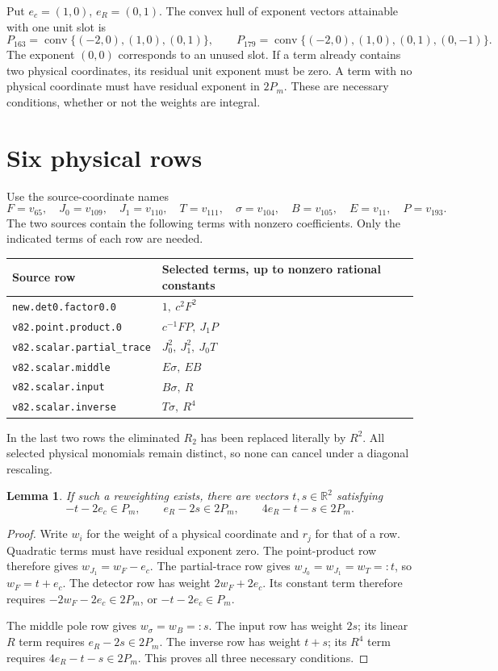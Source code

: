 \documentclass[11pt]{article}
\newtheorem{lemma}{Lemma}
\newcommand{\R}{\mathbb R}
\begin{document}
Put \(e_c=(1,0)\), \(e_R=(0,1)\). The convex hull of exponent
vectors attainable with one unit slot is
\[
 P_{163}=\operatorname{conv}\{(-2,0),(1,0),(0,1)\},\qquad
 P_{179}=\operatorname{conv}\{(-2,0),(1,0),(0,1),(0,-1)\}.
\]
The exponent \((0,0)\) corresponds to an unused slot. If a term
already contains two physical coordinates, its residual unit exponent
must be zero. A term with no physical coordinate must have residual
exponent in \(2P_m\). These are necessary conditions, whether or not
the weights are integral.

\section{Six physical rows}
Use the source-coordinate names
\[
 F=v_{65},\quad J_0=v_{109},\quad J_1=v_{110},\quad
 T=v_{111},\quad \sigma=v_{104},\quad B=v_{105},\quad
 E=v_{11},\quad P=v_{193}.
\]
The two sources contain the following terms with nonzero coefficients.
Only the indicated terms of each row are needed.
\begin{center}\small
\begin{tabular}{ll}
\toprule
Source row & Selected terms, up to nonzero rational constants\\
\midrule
\texttt{new.det0.factor0.0}&\(1,\ c^2F^2\)\\
\texttt{v82.point.product.0}&\(c^{-1}FP,\ J_1P\)\\
\texttt{v82.scalar.partial\_trace}&\(J_0^2,\ J_1^2,\ J_0T\)\\
\texttt{v82.scalar.middle}&\(E\sigma,\ EB\)\\
\texttt{v82.scalar.input}&\(B\sigma,\ R\)\\
\texttt{v82.scalar.inverse}&\(T\sigma,\ R^4\)\\
\bottomrule
\end{tabular}
\end{center}
In the last two rows the eliminated \(R_2\) has been replaced literally
by \(R^2\). All selected physical monomials remain distinct, so none
can cancel under a diagonal rescaling.

\begin{lemma}
If such a reweighting exists, there are vectors \(t,s\in\R^2\)
satisfying
\begin{equation}\label{ineq}
 -t-2e_c\in P_m,\qquad
 e_R-2s\in2P_m,\qquad
 4e_R-t-s\in2P_m.
\end{equation}
\end{lemma}
\begin{proof}
Write \(w_i\) for the weight of a physical coordinate and \(r_j\)
for that of a row. Quadratic terms must have residual exponent zero.
The point-product row therefore gives \(w_{J_1}=w_F-e_c\).
The partial-trace row gives
\(w_{J_0}=w_{J_1}=w_T=:t\), so \(w_F=t+e_c\).
The detector row has weight \(2w_F+2e_c\). Its constant term
therefore requires \(-2w_F-2e_c\in2P_m\), or
\(-t-2e_c\in P_m\).

The middle pole row gives \(w_\sigma=w_B=:s\). The input
row has weight \(2s\); its linear \(R\) term requires
\(e_R-2s\in2P_m\). The inverse row has weight \(t+s\);
its \(R^4\) term requires \(4e_R-t-s\in2P_m\).
This proves all three necessary conditions.
\end{proof}
\end{document}
